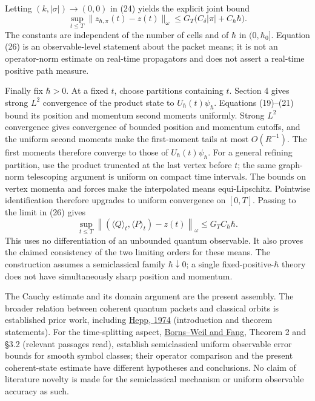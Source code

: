 \documentclass[11pt,a4paper]{article}
\begin{document}
Letting \((k,|\sigma|)\to(0,0)\) in (24) yields the explicit joint bound
\[
 \sup_{t\le T}\|z_{\hbar,\pi}(t)-z(t)\|_\omega
 \le G_T\big(C_\delta|\pi|+C_\hbar \hbar\big).\tag{26}
\] The constants are independent of the number of cells and of \(\hbar\)
in \((0,\hbar_0]\). Equation (26) is an observable-level statement about
the packet means; it is not an operator-norm estimate on real-time
propagators and does not assert a real-time positive path measure.

Finally fix \(\hbar>0\). At a fixed \(t\), choose partitions containing
\(t\). Section 4 gives strong \(L^2\) convergence of the product state
to \(U_\hbar(t)\psi_\hbar\). Equations (19)--(21) bound its position and
momentum second moments uniformly. Strong \(L^2\) convergence gives
convergence of bounded position and momentum cutoffs, and the uniform
second moments make the first-moment tails at most \(O(R^{-1})\). The
first moments therefore converge to those of \(U_\hbar(t)\psi_\hbar\).
For a general refining partition, use the product truncated at the last
vertex before \(t\); the same graph-norm telescoping argument is uniform
on compact time intervals. The bounds on vertex momenta and forces make
the interpolated means equi-Lipschitz. Pointwise identification
therefore upgrades to uniform convergence on \([0,T]\). Passing to the
limit in (26) gives \[
 \sup_{t\le T}
 \left\|(\langle Q\rangle_t,\langle P\rangle_t)-z(t)\right\|_\omega
 \le G_T C_\hbar \hbar.\tag{27}
\] This uses no differentiation of an unbounded quantum observable. It
also proves the claimed consistency of the two limiting orders for these
means. The construction assumes a semiclassical family
\(\hbar\downarrow0\); a single fixed-positive-\(\hbar\) theory does not
have simultaneously sharp position and momentum.

The Cauchy estimate and its domain argument are the present assembly.
The broader relation between coherent quantum packets and classical
orbits is established prior work, including
\href{https://doi.org/10.1007/BF01646348}{Hepp, 1974} (introduction and
theorem statements). For the time-splitting aspect,
\href{https://arxiv.org/pdf/2208.07957}{Borns--Weil and Fang}, Theorem 2
and §3.2 (relevant passages read), establish semiclassical uniform
observable error bounds for smooth symbol classes; their operator
comparison and the present coherent-state estimate have different
hypotheses and conclusions. No claim of literature novelty is made for
the semiclassical mechanism or uniform observable accuracy as such.
\end{document}
